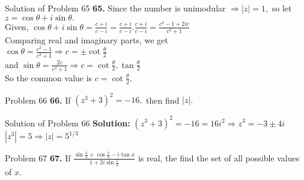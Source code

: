 \documentclass[aspectratio=169,8pt]{beamer}
\begin{document}
\begin{frame}{Solution of Problem 65}
  \textbf{65.} Since the number is unimodular $\Rightarrow |z| = 1,$ so let $z = \cos\theta + i\sin\theta.$\\
  \vspace*{0.2cm}
  Given, $\cos\theta + i\sin\theta = \frac{c + i}{c - i} = \frac{c + i}{c - i}.\frac{c + i}{c - i} = \frac{c^2 - 1 + 2ic}{c^2 + 1}$\\
  \vspace*{0.2cm}
  Comparing real and imaginary parts, we get\\
  \vspace*{0.2cm}
  $\cos\theta = \frac{c^2 - 1}{c^2 + 1} \Rightarrow c = \pm\cot\frac{\theta}{2}$\\
  \vspace*{0.2cm}
  and $\sin\theta = \frac{2c}{c^2 + 1} \Rightarrow c = \cot\frac{\theta}{2}, \tan\frac{\theta}{2}$\\
  \vspace*{0.2cm}
  So the common value is $c = \cot\frac{\theta}{2}.$
\end{frame}
\begin{frame}{Problem 66}
  \textbf{66.} If $(z^3 + 3)^2 = -16,$ then find $|z|.$
\end{frame}
\begin{frame}{Solution of Problem 66}
  \textbf{Solution:} $(z^3 + 3)^2 = -16 = 16i^2 \Rightarrow z^3 = -3 \pm 4i$\\
  \vspace*{0.2cm}
  $|z^3| = 5 \Rightarrow |z| = 5^{1/3}$
\end{frame}
\begin{frame}{Problem 67}
  \textbf{67.} If $\frac{\sin\frac{x}{2} + \cos\frac{x}{2} - i\tan x}{1 + 2i\sin\frac{x}{2}}$ is real, the find the set of all possible values of $x.$
\end{frame}
\end{document}
